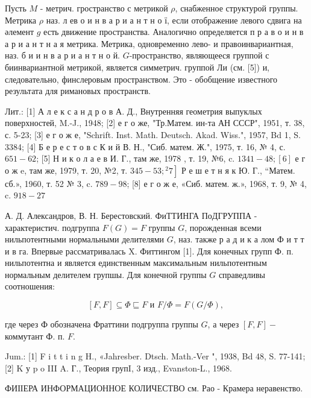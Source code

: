 \documentclass[10pt]{article}
\begin{document}
Пусть $M$ - метрич. гространство с метрикой $\rho$, снабженное структурой группы. Метрика $\rho$ наз. л ев о и н в а р и а н т н о ї, если отображение левого сдвига на әлемент $g$ есть движение пространства. Аналогично определяется п р а в о и н в а р и а н т н а я метрика. Метрика, одновременно лево- и правоинвариантная, наз. б и и н в а р и а н т н о й. $G$-пространство, являющееся группой с биинвариантной метрикой, является симметрич. группой Ли (см. [5]) и, следовательно, финслеровым пространством. Это - обобщение известного результата для римановых пространств.



Лит.: [1] А л е к с а н д р о в А. Д., Внутренняя геометрия выпуклых поверхностей, M.-J., 1948; [2] е г о же, "Тр.Матем. ин-та АН СССР", 1951, т. 38, с. 5-23; [3] е г о ж е, "Schrift. Inst. Math. Deutsch. Akad. Wiss.", 1957, Bd 1, S. 3384; [4] Б е р е с т о в с К и й В. Н., "Сиб. матем. Ж.", 1975, т. 16, № 4, с. $651-62$; [5] Н и к о л а е в И. Г., там же, 1978 , т. 19, №6, c. $1341-48 ;[6]$ е г о ж e, там же, 1979, т. 20, №2, т. $\left.345-53 ;{ }^{2} 7\right]$ Р е ш е т н я к Ю. Г., “Матем. сб.», 1960, т. 52 № 3, c. $789-98$; [8] е г о ж е, «Сиб. матем. ж.», 1968, т. 9, № 4, c. $918-27$



А. Д. Александров, В. Н. Берестовский. ФиТТИНГА ПоДГРУППА - характеристич. подгруппа $F(G)=F$ группы $G$, порожденная всеми нильпотентными нормальными делителями $G$, наз. также р а д и к а лом Ф и т т и в га. Впервые рассматривалась X. Фиттингом [1]. Для конечных групп Ф. п. нильпотентна и является единственным максимальным нильпотентным нормальным делителем групшы. Для конечной группы $G$ справедливы соотношения:



\[

[F, F] \subseteq \Phi \sqsubseteq F \text { и } F / \Phi=F(G / \Phi) \text {, }

\]



где через Ф обозначена Фраттини подгруппа группы $G$, а через $[F, F]-$ коммутант Ф. п. $F$.



Jum.: [1] F i t t i n g H., «Jahresber. Dtsch. Math.-Ver ", 1938, Bd 48, S. 77-141; [2] K у p o III A. Г., Теория групI, 3 изд., Evanston-L., 1968.



ФИІІЕРА ИНФОРМАЦИОННОЕ КОЛИЧЕСТВО см. Рао - Крамера неравенство.
\end{document}
